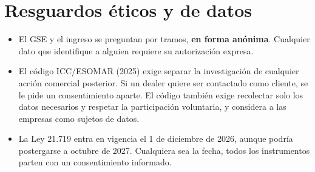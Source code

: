\documentclass[11pt,a4paper]{article}
\begin{document}
\section{Resguardos éticos y de datos}
\begin{itemize}
\item El GSE y el ingreso se preguntan por tramos, \textbf{en forma anónima}. Cualquier dato que identifique a alguien requiere su autorización expresa.
\item El código ICC/ESOMAR (2025) exige separar la investigación de cualquier acción comercial posterior. Si un dealer quiere ser contactado como cliente, se le pide un consentimiento aparte. El código también exige recolectar solo los datos necesarios y respetar la participación voluntaria, y considera a las empresas como sujetos de datos.
\item La Ley 21.719 entra en vigencia el 1 de diciembre de 2026, aunque podría postergarse a octubre de 2027. Cualquiera sea la fecha, todos los instrumentos parten con un consentimiento informado.
\end{itemize}

\end{document}
